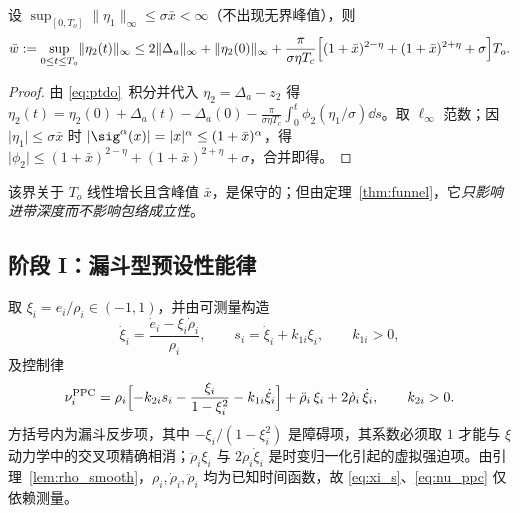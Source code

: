 \begin{lemma}[阶段 I 残差一致有界]\label{lem:residual}
设 \(\sup_{[0,T_o]}\lVert\eta_1\rVert_\infty\le\sigma\bar x<\infty\)（不出现无界峰值），则
\begin{equation}
\bar w:=\sup_{0\le t\le T_o}\lVert\eta_2(t)\rVert_\infty
\le 2\lVert\Delta_a\rVert_\infty+\lVert\eta_2(0)\rVert_\infty
+\frac{\pi}{\sigma\eta T_c}\Bigl[(1+\bar x)^{2-\eta}+(1+\bar x)^{2+\eta}+\sigma\Bigr]T_o .
\label{eq:residual_bound}
\end{equation}
\end{lemma}

\begin{proof}
由 \eqref{eq:ptdo}~积分并代入 \(\eta_2=\Delta_a-z_2\) 得
\(\eta_2(t)=\eta_2(0)+\Delta_a(t)-\Delta_a(0)-\frac{\pi}{\sigma\eta T_c}\int_0^t\phi_2(\eta_1/\sigma)\dd s\)。取 \(\ell_\infty\) 范数；因 \(\lvert\eta_1\rvert\le\sigma\bar x\) 时 \(\lvert\sig^{\alpha}(x)\rvert=\lvert x\rvert^{\alpha}\le(1+\bar x)^{\alpha}\)，得 \(\lvert\phi_2\rvert\le(1+\bar x)^{2-\eta}+(1+\bar x)^{2+\eta}+\sigma\)，合并即得。
\end{proof}

该界关于 \(T_o\) 线性增长且含峰值 \(\bar x\)，是保守的；但由定理~\ref{thm:funnel}，它\emph{只影响进带深度而不影响包络成立性}。

\subsection{阶段 I：漏斗型预设性能律}
\label{sec:ppc}

取 \(\xi_i=e_i/\rho_i\in(-1,1)\)，并由可测量构造
\begin{equation}
\dot\xi_i=\frac{\dot e_i-\xi_i\dot\rho_i}{\rho_i},\qquad
s_i=\dot\xi_i+k_{1i}\xi_i,\qquad k_{1i}>0 ,
\label{eq:xi_s}
\end{equation}
及控制律
\begin{equation}
\nu_i^{\mathrm{PPC}}=\rho_i\Bigl[-k_{2i}s_i-\frac{\xi_i}{1-\xi_i^{2}}-k_{1i}\dot\xi_i\Bigr]
+\ddot\rho_i\,\xi_i+2\dot\rho_i\,\dot\xi_i,\qquad k_{2i}>0 .
\label{eq:nu_ppc}
\end{equation}
方括号内为漏斗反步项，其中 \(-\xi_i/(1-\xi_i^2)\) 是障碍项，其系数必须取 \(1\) 才能与 \(\xi\) 动力学中的交叉项精确相消；\(\ddot\rho_i\xi_i\) 与 \(2\dot\rho_i\dot\xi_i\) 是时变归一化引起的虚拟强迫项。由引理~\ref{lem:rho_smooth}，\(\rho_i,\dot\rho_i,\ddot\rho_i\) 均为已知时间函数，故 \eqref{eq:xi_s}、\eqref{eq:nu_ppc} 仅依赖测量。

